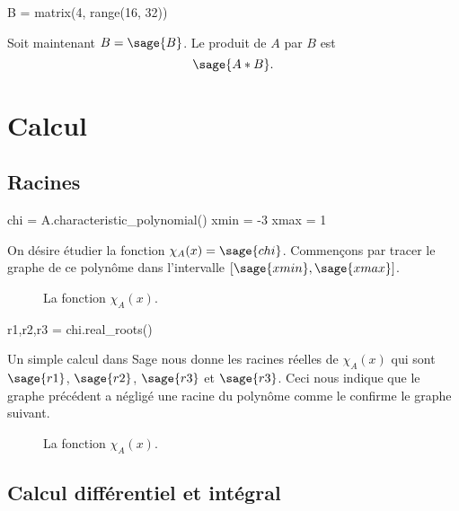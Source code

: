 \documentclass{article}
\begin{document}
\begin{sagesilent}
B = matrix(4, range(16, 32))
\end{sagesilent}

Soit maintenant $B=\sage{B}$. Le produit de $A$ par $B$ est 
\[
\sage{A*B}.
\]

\newpage

\section{Calcul}

\subsection{Racines}

\begin{sagesilent}
chi = A.characteristic_polynomial()
xmin = -3
xmax = 1
\end{sagesilent}

On désire étudier la fonction $\chi_A(x)=\sage{chi}$. Commençons par tracer le graphe de ce polynôme dans l'intervalle $[\sage{xmin}, \sage{xmax}]$.


\begin{figure}[h]
\begin{center}
\caption{La fonction $\chi_A(x)$.}
\end{center}
\end{figure}

\begin{sageblock}
r1,r2,r3 = chi.real_roots()
\end{sageblock}

Un simple calcul dans Sage nous donne les racines réelles de $\chi_A(x)$ qui sont $\sage{r1}$, $\sage{r2}$, $\sage{r3}$ et $\sage{r3}$. Ceci nous indique que le graphe précédent a négligé une racine du polynôme comme le confirme le graphe suivant.

\begin{figure}[h]
\begin{center}
\caption{La fonction $\chi_A(x)$.}
\end{center}
\end{figure}

\subsection{Calcul différentiel et intégral}
\end{document}

